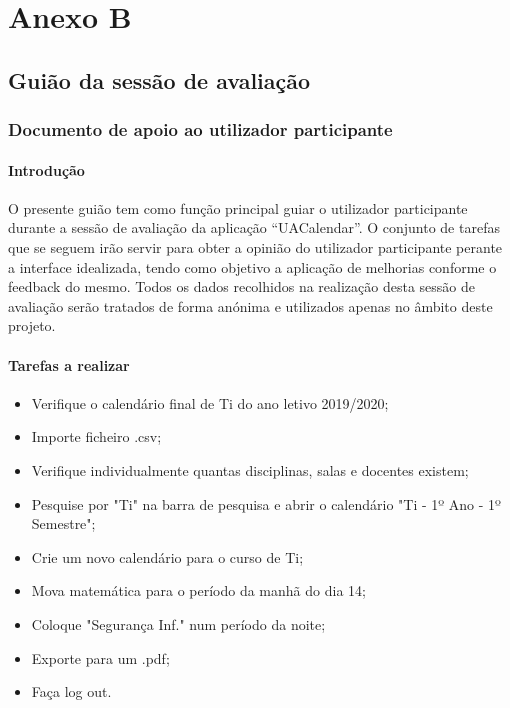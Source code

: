 \documentclass[11pt, twoside]{report}
\begin{document}
	
	\chapter*{Anexo B}
	\section*{Guião da sessão de avaliação}
	\subsection*{Documento de apoio ao utilizador participante}
	
	
	\subsubsection*{Introdução}
	O presente guião tem como função principal guiar o utilizador participante durante a sessão de avaliação da aplicação “UACalendar”. O conjunto de tarefas que se seguem irão servir para obter a opinião do utilizador participante perante a interface idealizada, tendo como objetivo a aplicação de melhorias conforme o feedback do mesmo.
	Todos os dados recolhidos na realização desta sessão de avaliação serão tratados de forma anónima e utilizados apenas no âmbito deste projeto.
	
	\subsubsection*{Tarefas a realizar}	
	\begin{itemize}
		\item Verifique o calendário final de Ti do ano letivo 2019/2020;
		\item Importe ficheiro .csv;
		\item Verifique individualmente quantas disciplinas, salas e docentes existem;
		\item Pesquise por "Ti" na barra de pesquisa e abrir o calendário "Ti - 1º Ano - 1º Semestre";
		\item Crie um novo calendário para o curso de Ti;
		\item Mova matemática para o período da manhã do dia 14;
		\item Coloque "Segurança Inf." num período da noite;
		\item Exporte para um .pdf;
		\item Faça log out.
	\end{itemize}
	
	
	
	
\end{document}

